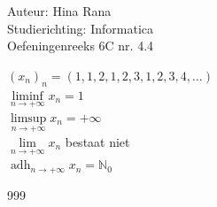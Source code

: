 \documentclass[a4paper]{article}
\begin{document}
\noindent \large Auteur: Hina Rana \\
\noindent \large Studierichting: Informatica\\
\noindent \large Oefeningenreeks 6C nr. 4.4 \\

\medskip

\normalsize

$ (x_n)_n = (1, 1, 2, 1, 2, 3, 1, 2, 3, 4, \dots) $ \\

$ \liminf\limits_{n \rightarrow +\infty} x_n = 1 $ \\

$ \limsup\limits_{n \rightarrow +\infty} x_n = +\infty $ \\

$ \lim\limits_{n \rightarrow +\infty} x_n $ bestaat niet \\

$ \operatorname{adh}_{n \rightarrow +\infty} x_n = \mathbb{N}_0 $

\begin{thebibliography}{999}
\end{thebibliography}
\end{document}
